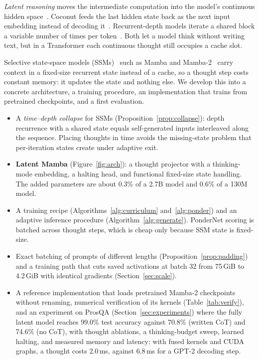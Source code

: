 \documentclass[10pt]{article}
\makeatletter
\renewcommand\paragraph{\@startsection{paragraph}{4}{\z@}{0.01em}{-1em}{\normalfont\normalsize\bfseries}}
\makeatother
\begin{document}
\emph{Latent reasoning} moves the intermediate computation into the model's continuous hidden space~\cite{zhu2025survey}. Coconut feeds the last hidden state back as the next input embedding instead of decoding it~\cite{hao2024coconut}. Recurrent-depth models iterate a shared block a variable number of times per token~\cite{geiping2025recurrent}. Both let a model think without writing text, but in a Transformer each continuous thought still occupies a cache slot.

Selective state-space models (SSMs)~\cite{gu2022s4} such as Mamba and Mamba-2~\cite{gu2023mamba,dao2024ssd} carry context in a fixed-size recurrent state instead of a cache, so a thought step costs constant memory: it updates the state and nothing else. We develop this into a concrete architecture, a training procedure, an implementation that trains from pretrained checkpoints, and a first evaluation.

\paragraph{Contributions.}
\begin{itemize}
\item A \emph{time--depth collapse} for SSMs (Proposition~\ref{prop:collapse}): depth recurrence with a shared state equals self-generated inputs interleaved along the sequence. Placing thoughts in time avoids the missing-state problem that per-iteration states create under adaptive exit.
\item \textbf{Latent Mamba} (Figure~\ref{fig:arch}): a thought projector with a thinking-mode embedding, a halting head, and functional fixed-size state handling. The added parameters are about 0.3\% of a 2.7B model and 0.6\% of a 130M model.
\item A training recipe (Algorithms~\ref{alg:curriculum} and~\ref{alg:ponder}) and an adaptive inference procedure (Algorithm~\ref{alg:generate}). PonderNet scoring is batched across thought steps, which is cheap only because SSM state is fixed-size.
\item Exact batching of prompts of different lengths (Proposition~\ref{prop:padding}) and a training path that cuts saved activations at batch 32 from 75\,GiB to 4.2\,GiB with identical gradients (Section~\ref{sec:scale}).
\item A reference implementation that loads pretrained Mamba-2 checkpoints without renaming, numerical verification of its kernels (Table~\ref{tab:verify}), and an experiment on ProsQA (Section~\ref{sec:experiments}) where the fully latent model reaches 99.0\% test accuracy against 70.8\% (written CoT) and 74.6\% (no CoT), with thought ablations, a thinking-budget sweep, learned halting, and measured memory and latency: with fused kernels and CUDA graphs, a thought costs 2.0\,ms, against 6.8\,ms for a GPT-2 decoding step.
\end{itemize}
\end{document}
